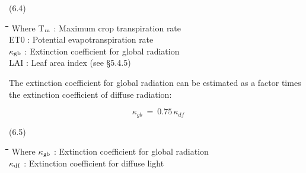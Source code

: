 \documentclass[11pt]{article}
\begin{document}
 \bigskip
\strut\hfill (6.4)
\nwln
\begin{tabbing}
\hspace{1.27cm}\=\hspace{1.27cm}\=\hspace{1.27cm}\=\hspace{1.27cm}\=%
\hspace{1.27cm}\=\hspace{1.27cm}\=\hspace{1.27cm}\=\hspace{1.27cm}\=%
\hspace{1.27cm}\=\hspace{1.27cm}\=\kill
Where\> \> T$_{{\rm m}}$\> : Maximum crop transpiration rate\> \> \> \> \> \> \> [cm d$^{{\rm -1}}$]\\
\>\> ET0\> : Potential evapotranspiration rate\> \> \> \> \> \> \> [cm d$^{{\rm -1}}$]\\
\>\> $\kappa$$_{{\rm gb}}$\> : Extinction coefficient for global radiation\> \> \> \> \> \> \> [-]\\
\>\> LAI\> : Leaf area index (see \S 5.4.5)\> \> \> \> \> \> \> [ha ha$^{{\rm -1}}$]
\end{tabbing}

\bigskip
\bigskip
The extinction coefficient for global radiation can be estimated as a factor times the
extinction coefficient of diffuse radiation:

\begin{displaymath}
\kappa  _{gb} ~=~ 0.75\, \kappa  _{df} 
\end{displaymath}

 \bigskip
\strut\hfill (6.5)
\nwln
\begin{tabbing}
\hspace{1.27cm}\=\hspace{1.27cm}\=\hspace{1.27cm}\=\hspace{1.27cm}\=%
\hspace{1.27cm}\=\hspace{1.27cm}\=\hspace{1.27cm}\=\hspace{1.27cm}\=%
\hspace{1.27cm}\=\hspace{1.27cm}\=\kill
Where\> \> $\kappa$$_{{\rm gb}}$\> : Extinction coefficient for global radiation\> \> \> \> \> \> \> [-]\\
\>\> $\kappa$$_{{\rm df}}$\> : Extinction coefficient for diffuse light\> \> \> \> \> \> \> [-]
\end{tabbing}
\end{document}
